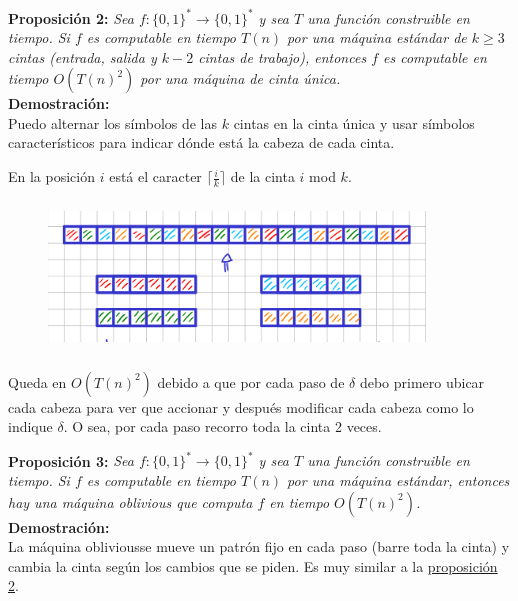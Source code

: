 \documentclass{article}
\begin{document}
\begin{flushleft}
  \textbf{\hypertarget{prop2}{Proposición 2:}} 
  \textit{Sea $f : \{0,1\}^* \rightarrow \{0,1\}^*$ y sea $T$ una función construible en tiempo. 
  Si $f$ es computable en tiempo $T(n)$ por una máquina estándar de $k \geq 3$ cintas (entrada, 
  salida y $k - 2$ cintas de trabajo), entonces $f$ es computable en tiempo $O(T(n)^2)$ por una 
  máquina de cinta única.}\\[0.5em]

  \textbf{\textcolor{Mulberry}{Demostración:}} \\[0.5em]

  Puedo alternar los símbolos de las $k$ cintas en la cinta única y usar símbolos característicos
  para indicar dónde está la cabeza de cada cinta.

  En la posición $i$ está el caracter $\lceil \frac{i}{k} \rceil$ de la cinta $i$ mod $k$.

  \begin{figure}[h] 
    \centering 
    \includegraphics[width=10cm, height=4cm]{./imagenes/4_cintas_a_1.png}
  \end{figure}

  Queda en $O(T(n)^2)$ debido a que por cada paso de $\delta$ debo primero ubicar cada cabeza para 
  ver que accionar y después modificar cada cabeza como lo indique $\delta$. O sea, por cada paso 
  recorro toda la cinta 2 veces.
\end{flushleft}

\begin{flushleft}
  \textbf{Proposición 3:}
  \textit{Sea $f : \{0,1\}^* \rightarrow \{0,1\}^*$ y sea $T$ una función construible en tiempo. Si $f$
  es computable en tiempo $T(n)$ por una máquina estándar, entonces hay una máquina oblivious que 
  computa $f$ en tiempo $O(T(n)^2)$.}\\[0.5em]

  \textbf{\textcolor{Mulberry}{Demostración:}} \\[0.5em]

  La máquina obliviousse mueve un patrón fijo en cada paso (barre toda la cinta) y cambia la cinta según 
  los cambios que se piden. Es muy similar a la \hyperlink{prop2}{\textcolor{Rhodamine}{proposición 2}}.
\end{flushleft}
\end{document}
